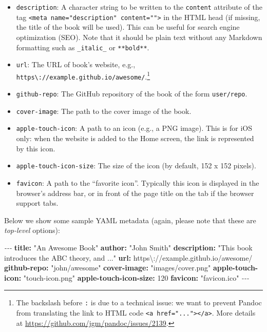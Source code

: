 \documentclass[
  12pt,
]{krantz}
\newenvironment{Shaded}{\begin{snugshade}}{\end{snugshade}}
\newcommand{\AttributeTok}[1]{\textcolor[rgb]{0.13,0.29,0.53}{#1}}
\newcommand{\DecValTok}[1]{\textcolor[rgb]{0.00,0.00,0.81}{#1}}
\newcommand{\FunctionTok}[1]{\textcolor[rgb]{0.13,0.29,0.53}{\textbf{#1}}}
\newcommand{\KeywordTok}[1]{\textcolor[rgb]{0.13,0.29,0.53}{\textbf{#1}}}
\newcommand{\PreprocessorTok}[1]{\textcolor[rgb]{0.56,0.35,0.01}{\textit{#1}}}
\newcommand{\StringTok}[1]{\textcolor[rgb]{0.31,0.60,0.02}{#1}}
\providecommand{\tightlist}{%
  \setlength{\itemsep}{0pt}\setlength{\parskip}{0pt}}
\theoremstyle{definition}
\theoremstyle{definition}
\theoremstyle{definition}
\theoremstyle{definition}
\theoremstyle{remark}
\begin{document}
\begin{itemize}
\tightlist
\item
  \texttt{description}: A character string to be written to the \texttt{content} attribute of the tag \texttt{\textless{}meta\ name="description"\ content=""\textgreater{}} in the HTML head (if missing, the title of the book will be used). This can be useful for search engine optimization (SEO). Note that it should be plain text without any Markdown formatting such as \texttt{\_italic\_} or \texttt{**bold**}.
\item
  \texttt{url}: The URL of book's website, e.g., \texttt{https\textbackslash{}://example.github.io/awesome/}.\footnote{The backslash before \texttt{:} is due to a technical issue: we want to prevent Pandoc from translating the link to HTML code \texttt{\textless{}a\ href="..."\textgreater{}\textless{}/a\textgreater{}}. More details at \url{https://github.com/jgm/pandoc/issues/2139}.}
\item
  \texttt{github-repo}: The GitHub repository of the book of the form \texttt{user/repo}.
\item
  \texttt{cover-image}: The path to the cover image of the book.
\item
  \texttt{apple-touch-icon}: A path to an icon (e.g., a PNG image). This is for iOS only: when the website is added to the Home screen, the link is represented by this icon.
\item
  \texttt{apple-touch-icon-size}: The size of the icon (by default, 152 x 152 pixels).
\item
  \texttt{favicon}: A path to the ``favorite icon''. Typically this icon is displayed in the browser's address bar, or in front of the page title on the tab if the browser support tabs.
\end{itemize}

Below we show some sample YAML metadata (again, please note that these are \emph{top-level} options):

\begin{Shaded}
\begin{Highlighting}[]
\PreprocessorTok{{-}{-}{-}}
\FunctionTok{title}\KeywordTok{:}\AttributeTok{ }\StringTok{"An Awesome Book"}
\FunctionTok{author}\KeywordTok{:}\AttributeTok{ }\StringTok{"John Smith"}
\FunctionTok{description}\KeywordTok{:}\AttributeTok{ }\StringTok{"This book introduces the ABC theory, and ..."}
\FunctionTok{url}\KeywordTok{:}\AttributeTok{ }\StringTok{\textquotesingle{}https\textbackslash{}://example.github.io/awesome/\textquotesingle{}}
\FunctionTok{github{-}repo}\KeywordTok{:}\AttributeTok{ }\StringTok{"john/awesome"}
\FunctionTok{cover{-}image}\KeywordTok{:}\AttributeTok{ }\StringTok{"images/cover.png"}
\FunctionTok{apple{-}touch{-}icon}\KeywordTok{:}\AttributeTok{ }\StringTok{"touch{-}icon.png"}
\FunctionTok{apple{-}touch{-}icon{-}size}\KeywordTok{:}\AttributeTok{ }\DecValTok{120}
\FunctionTok{favicon}\KeywordTok{:}\AttributeTok{ }\StringTok{"favicon.ico"}
\PreprocessorTok{{-}{-}{-}}
\end{Highlighting}
\end{Shaded}
\end{document}
